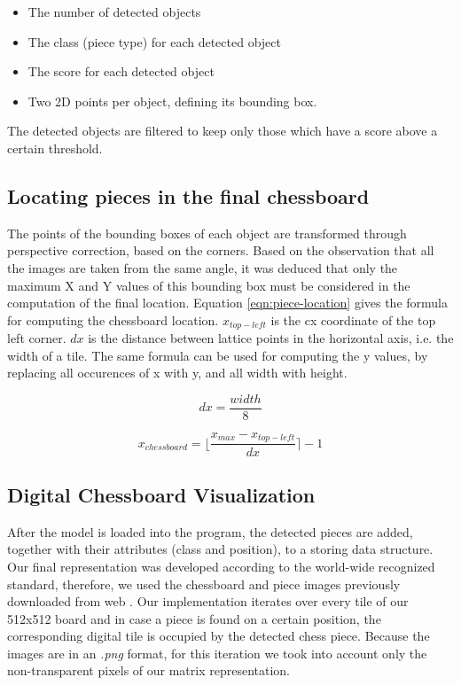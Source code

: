 \documentclass[conference]{IEEEtran}
\begin{document}
\begin{itemize}
    \item The number of detected objects
    \item The class (piece type) for each detected object
    \item The score for each detected object
    \item Two 2D points per object, defining its bounding box.
\end{itemize}

The detected objects are filtered to keep only those which have a score above a certain threshold.

\subsection{Locating pieces in the final chessboard}

The points of the bounding boxes of each object are transformed through perspective correction, based on the corners. Based on the observation that all the images are taken from the same angle, it was deduced that only the maximum X and Y values of this bounding box must be considered in the computation of the final location. Equation \ref{eqn:piece-location} gives the formula for computing the chessboard location. $x_{top-left}$ is the cx coordinate of the top left corner. $dx$ is the distance between lattice points in the horizontal axis, i.e. the width of a tile. The same formula can be used for computing the y values, by replacing all occurences of x with y, and all width with height.

\newcommand{\round}[1]{\ensuremath{\lfloor#1\rceil}}

\begin{equation}
dx = \frac{width}{8}
\end{equation}

\begin{equation}
\label{eqn:piece-location}
x_{chessboard} = \round{\frac{x_{max} - x_{top-left}}{dx}} - 1
\end{equation}


\subsection{Digital Chessboard Visualization}
After the model is loaded into the program, the detected pieces are added, together with their attributes (class and position), to a storing data structure. Our final representation was developed according to the world-wide recognized standard, therefore, we used the chessboard and piece images previously downloaded from web \cite{chess_piece_board}. Our implementation iterates over every tile of our 512x512 board and in case a piece is found on a certain position, the corresponding digital tile is occupied by the detected chess piece. Because the images are in an \emph{.png} format, for this iteration we took into account only the non-transparent pixels of our matrix representation. 
\end{document}
